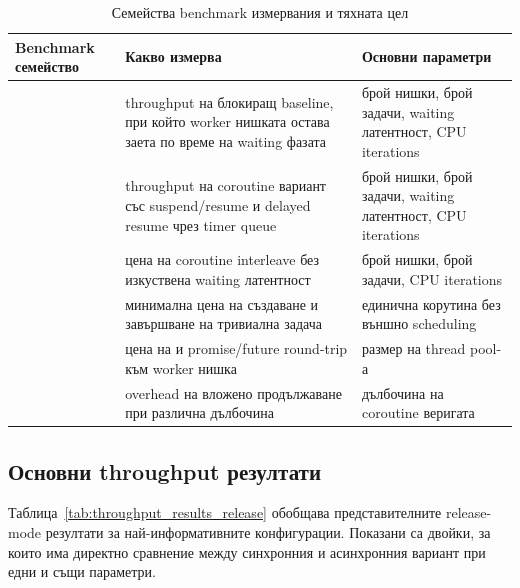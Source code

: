 \begin{table}[H]
\centering
\small
\caption{Семейства benchmark измервания и тяхната цел}
\label{tab:benchmark_families}
\begin{tabularx}{\textwidth}{L{3.4cm}L{5.2cm}Y}
\toprule
\textbf{Benchmark семейство} & \textbf{Какво измерва} & \textbf{Основни параметри} \\
\midrule
{} & throughput на блокиращ baseline, при който worker нишката остава заета по време на waiting фазата & брой нишки, брой задачи, waiting латентност, CPU iterations \\
 & throughput на coroutine вариант със suspend/resume и delayed resume чрез timer queue & брой нишки, брой задачи, waiting латентност, CPU iterations \\
 & цена на coroutine interleave без изкуствена waiting латентност & брой нишки, брой задачи, CPU iterations \\
 & минимална цена на създаване и завършване на тривиална задача & единична корутина без външно scheduling \\
 & цена на  и promise/future round-trip към worker нишка & размер на thread pool-а \\
 & overhead на вложено  продължаване при различна дълбочина & дълбочина на coroutine веригата \\
\bottomrule
\end{tabularx}
\end{table}

\subsection{Основни throughput резултати}

Таблица~\ref{tab:throughput_results_release} обобщава представителните release-mode резултати за най-информативните конфигурации. Показани са двойки, за които има директно сравнение между синхронния и асинхронния вариант при едни и същи параметри.

